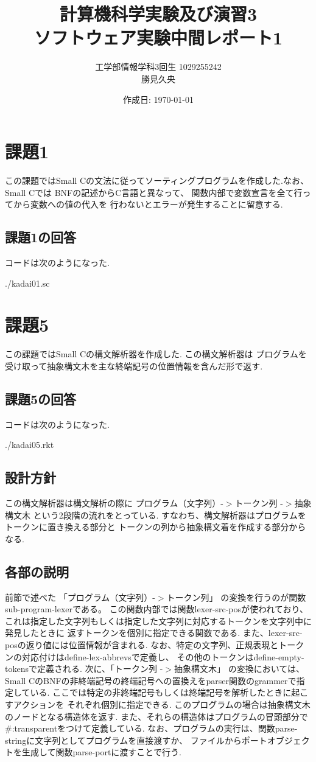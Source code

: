 \documentclass[a4j,dvipdfmx]{jarticle}
\begin{document}
\title{計算機科学実験及び演習3\\ソフトウェア実験中間レポート1}
\author{工学部情報学科3回生 1029255242\\勝見久央}
\date{作成日: \today} %
\maketitle
\section{課題1}
この課題ではSmall Cの文法に従ってソーティングプログラムを作成した.なお、Small Cでは
BNFの記述からC言語と異なって、
関数内部で変数宣言を全て行ってから変数への値の代入を
行わないとエラーが発生することに留意する.

\subsection{課題1の回答}
コードは次のようになった.

{./kadai01.sc}
\section{課題5}
この課題ではSmall Cの構文解析器を作成した.
この構文解析器は
プログラムを受け取って抽象構文木を主な終端記号の位置情報を含んだ形で返す.
\subsection{課題5の回答}
コードは次のようになった.

{./kadai05.rkt}
\subsection{設計方針}
この構文解析器は構文解析の際に
プログラム（文字列）-$>$トークン列 -$>$抽象構文木
という2段階の流れをとっている.
すなわち、構文解析器はプログラムをトークンに置き換える部分と
トークンの列から抽象構文着を作成する部分からなる.
\subsection{各部の説明}
前節で述べた
「プログラム（文字列）-$>$トークン列」
の変換を行うのが関数sub-program-lexerである。
この関数内部では関数lexer-src-posが使われており、
これは指定した文字列もしくは指定した文字列に対応するトークンを文字列中に発見したときに
返すトークンを個別に指定できる関数である.
また、lexer-src-posの返り値には位置情報が含まれる.
なお、特定の文字列、正規表現とトークンの対応付けはdefine-lex-abbrevsで定義し、
その他のトークンはdefine-empty-tokensで定義される.
次に、「トークン列 -$>$抽象構文木」
の変換においては、
Small CのBNFの非終端記号の終端記号への置換えをparser関数のgrammerで指定している.
ここでは特定の非終端記号もしくは終端記号を解析したときに起こすアクションを
それぞれ個別に指定できる.
このプログラムの場合は抽象構文木のノードとなる構造体を返す.
また、それらの構造体はプログラムの冒頭部分で\#:transparentをつけて定義している.
なお、プログラムの実行は、関数parse-stringに文字列としてプログラムを直接渡すか、
ファイルからポートオブジェクトを生成して関数parse-portに渡すことで行う.
\end{document}

